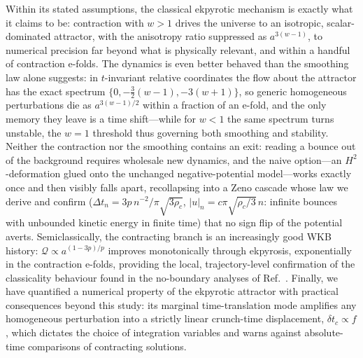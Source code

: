 \documentclass[11pt,a4paper]{article}
\newcommand{\rhoc}{\rho_c}
\newcommand{\cQ}{\mathcal{Q}}
\begin{document}
Within its stated assumptions, the classical ekpyrotic mechanism is exactly
what it claims to be: contraction with $w>1$ drives the universe to an
isotropic, scalar-dominated attractor, with the anisotropy ratio suppressed
as $a^{3(w-1)}$, to numerical precision far beyond what is physically
relevant, and within a handful of contraction e-folds. The dynamics is
even better behaved than the smoothing law alone suggests: in
$t$-invariant relative coordinates the flow about the attractor has the
exact spectrum $\{0,-\frac32(w-1),-3(w+1)\}$, so generic homogeneous
perturbations die as $a^{3(w-1)/2}$ within a fraction of an e-fold, and the
only memory they leave is a time shift---while for $w<1$ the same spectrum
turns unstable, the $w=1$ threshold thus governing both smoothing and
stability. Neither the contraction nor the smoothing contains an exit:
reading a bounce out of the background requires wholesale new dynamics, and
the naive option---an $H^2$-deformation glued onto the unchanged
negative-potential model---works exactly once and then visibly falls apart,
recollapsing into a Zeno cascade whose law we derive and confirm ($\Delta
t_n=3p\,n^{-2}/\pi\sqrt{3\rhoc}$, $|u|_n=c\pi\sqrt{\rhoc/3}\,n$: infinite
bounces with unbounded kinetic energy in finite time) that no sign flip of
the potential averts. Semiclassically, the
contracting branch is an increasingly good WKB history:
$\cQ\propto a^{(1-3p)/p}$ improves monotonically through ekpyrosis,
exponentially in the contraction e-folds, providing the local,
trajectory-level confirmation of the classicality behaviour found in the
no-boundary analyses of Ref.~\cite{Lehners:2015}. Finally, we have
quantified a numerical property of the ekpyrotic attractor with practical
consequences beyond this study: its marginal time-translation mode
amplifies any homogeneous perturbation into a strictly linear
crunch-time displacement, $\delta t_c\propto f$, which dictates the choice
of integration variables and warns against absolute-time comparisons of
contracting solutions.
\end{document}
